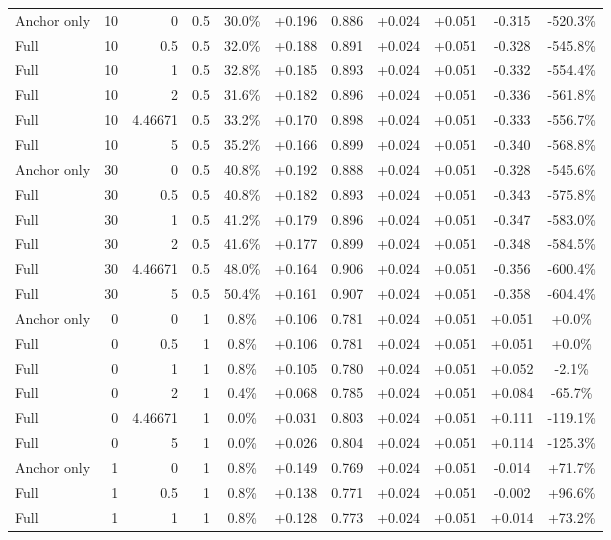 \begin{table}[htbp]
\begin{tabular}{lrrrccccccc}
Anchor only & 10 & 0 & 0.5 & 30.0\% & +0.196 & 0.886 & +0.024 & +0.051 & -0.315 & -520.3\% \\
Full & 10 & 0.5 & 0.5 & 32.0\% & +0.188 & 0.891 & +0.024 & +0.051 & -0.328 & -545.8\% \\
Full & 10 & 1 & 0.5 & 32.8\% & +0.185 & 0.893 & +0.024 & +0.051 & -0.332 & -554.4\% \\
Full & 10 & 2 & 0.5 & 31.6\% & +0.182 & 0.896 & +0.024 & +0.051 & -0.336 & -561.8\% \\
Full & 10 & 4.46671 & 0.5 & 33.2\% & +0.170 & 0.898 & +0.024 & +0.051 & -0.333 & -556.7\% \\
Full & 10 & 5 & 0.5 & 35.2\% & +0.166 & 0.899 & +0.024 & +0.051 & -0.340 & -568.8\% \\
Anchor only & 30 & 0 & 0.5 & 40.8\% & +0.192 & 0.888 & +0.024 & +0.051 & -0.328 & -545.6\% \\
Full & 30 & 0.5 & 0.5 & 40.8\% & +0.182 & 0.893 & +0.024 & +0.051 & -0.343 & -575.8\% \\
Full & 30 & 1 & 0.5 & 41.2\% & +0.179 & 0.896 & +0.024 & +0.051 & -0.347 & -583.0\% \\
Full & 30 & 2 & 0.5 & 41.6\% & +0.177 & 0.899 & +0.024 & +0.051 & -0.348 & -584.5\% \\
Full & 30 & 4.46671 & 0.5 & 48.0\% & +0.164 & 0.906 & +0.024 & +0.051 & -0.356 & -600.4\% \\
Full & 30 & 5 & 0.5 & 50.4\% & +0.161 & 0.907 & +0.024 & +0.051 & -0.358 & -604.4\% \\
Anchor only & 0 & 0 & 1 & 0.8\% & +0.106 & 0.781 & +0.024 & +0.051 & +0.051 & +0.0\% \\
Full & 0 & 0.5 & 1 & 0.8\% & +0.106 & 0.781 & +0.024 & +0.051 & +0.051 & +0.0\% \\
Full & 0 & 1 & 1 & 0.8\% & +0.105 & 0.780 & +0.024 & +0.051 & +0.052 & -2.1\% \\
Full & 0 & 2 & 1 & 0.4\% & +0.068 & 0.785 & +0.024 & +0.051 & +0.084 & -65.7\% \\
Full & 0 & 4.46671 & 1 & 0.0\% & +0.031 & 0.803 & +0.024 & +0.051 & +0.111 & -119.1\% \\
Full & 0 & 5 & 1 & 0.0\% & +0.026 & 0.804 & +0.024 & +0.051 & +0.114 & -125.3\% \\
Anchor only & 1 & 0 & 1 & 0.8\% & +0.149 & 0.769 & +0.024 & +0.051 & -0.014 & +71.7\% \\
Full & 1 & 0.5 & 1 & 0.8\% & +0.138 & 0.771 & +0.024 & +0.051 & -0.002 & +96.6\% \\
Full & 1 & 1 & 1 & 0.8\% & +0.128 & 0.773 & +0.024 & +0.051 & +0.014 & +73.2\% \\

\end{tabular}
\end{table}
